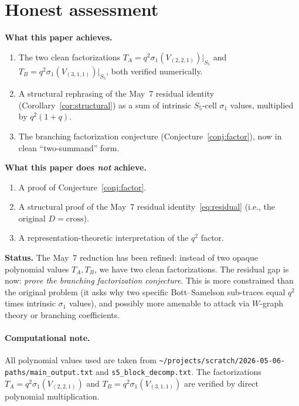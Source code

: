 \documentclass[11pt]{article}
\theoremstyle{definition}
\begin{document}
\section{Honest assessment}

\textbf{What this paper achieves.}
\begin{enumerate}[leftmargin=2em,topsep=0.3em,itemsep=0.2em]
\item The two clean factorizations $T_A = q^2 \sigma_1(V_{(2,2,1)})\big|_{S_5}$ and $T_B = q^2 \sigma_1(V_{(3,1,1)})\big|_{S_5}$, both verified numerically.
\item A structural rephrasing of the May~7 residual identity (Corollary~\ref{cor:structural}) as a sum of intrinsic $S_5$-cell $\sigma_1$ values, multiplied by $q^2(1+q)$.
\item The branching factorization conjecture (Conjecture~\ref{conj:factor}), now in clean ``two-summand'' form.
\end{enumerate}

\textbf{What this paper does \emph{not} achieve.}
\begin{enumerate}[leftmargin=2em,topsep=0.3em,itemsep=0.2em]
\item A proof of Conjecture~\ref{conj:factor}.
\item A structural proof of the May~7 residual identity~\eqref{eq:residual} (i.e., the original $D = \mathrm{cross}$).
\item A representation-theoretic interpretation of the $q^2$ factor.
\end{enumerate}

\textbf{Status.} The May~7 reduction has been refined: instead of two opaque polynomial values $T_A, T_B$, we have two clean factorizations. The residual gap is now: \emph{prove the branching factorization conjecture}. This is more constrained than the original problem (it asks why two specific Bott--Samelson sub-traces equal $q^2$ times intrinsic $\sigma_1$ values), and possibly more amenable to attack via $W$-graph theory or branching coefficients.

\paragraph{Computational note.} All polynomial values used are taken from \texttt{\textasciitilde/projects/scratch/2026-05-06-paths/main\_output.txt} and \texttt{s5\_block\_decomp.txt}. The factorizations $T_A = q^2 \sigma_1(V_{(2,2,1)})$ and $T_B = q^2 \sigma_1(V_{(3,1,1)})$ are verified by direct polynomial multiplication.
\end{document}
